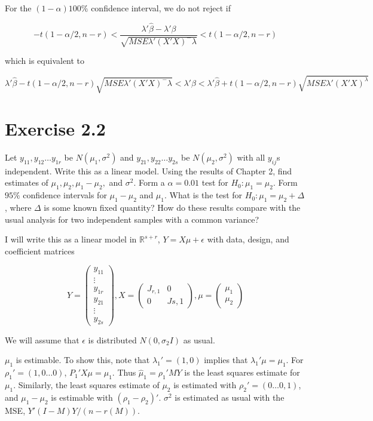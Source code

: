 \documentclass{article}
\newcommand{\R}{\mathbb{R}}
\begin{document}
For the $(1-\alpha)100\%$ confidence interval, we do not reject if

\[
-t(1-\alpha/2, n-r) < \frac{\lambda'\hat{\beta} - \lambda'\beta}{
\sqrt{MSE\lambda'(X'X)^-\lambda}
} < t(1-\alpha/2, n-r)
\]

which is equivalent to

\[
\lambda'\hat{\beta} - t(1-\alpha/2, n-r)\sqrt{MSE\lambda'(X'X)^-\lambda} < \lambda'\beta < \lambda'\hat{\beta} + t(1-\alpha/2, n-r)\sqrt{MSE\lambda'(X'X)^\lambda}
\]

\section*{Exercise 2.2}
Let $y_{11}, y_{12} \dots y_{1r}$ be $N(\mu_1, \sigma^2)$ and $y_{21}, y_{22} \dots y_{2s}$ be $N(\mu_2, \sigma^2)$ with all $y_{ij}$s independent. Write this as a linear model. Using the results of Chapter 2, find estimates of $\mu_1, \mu_2, \mu_1-\mu_2,$ and $\sigma^2$. Form a $\alpha = 0.01$ test for $H_0:\mu_1 = \mu_2$. Form $95\%$ confidence intervals for $\mu_1-\mu_2$ and $\mu_1$. What is the test for $H_0: \mu_1 = \mu_2 + \Delta$, where $\Delta$ is some known fixed quantity? How do these results compare with the usual analysis for two independent samples with a common variance?

I will write this as a linear model in $\R^{s+r}$, $Y=X\mu + \epsilon$ with data, design, and coefficient matrices

\[
Y = \begin{pmatrix}
y_{11} \\
\vdots \\
y_{1r} \\
y_{21} \\
\vdots \\
y_{2s}
\end{pmatrix},
X = \begin{pmatrix}
J_{r,1} & 0 \\
0 & J{s, 1}
\end{pmatrix},
\mu = \begin{pmatrix}
\mu_1 \\ \mu_2
\end{pmatrix}
\]

We will assume that $\epsilon$ is distributed $N(0, \sigma_2I)$ as usual.

$\mu_1$ is estimable. To show this, note that $\lambda_1' = (1, 0)$ implies that $\lambda_1' \mu = \mu_1$. For $\rho_1' = (1, 0 \dots 0)$, $P_1'X\mu = \mu_1$. Thus $\hat{\mu}_1 = \rho_1'MY$ is the least squares estimate for $\mu_1$. Similarly, the least squares estimate of $\mu_2$ is estimated with $\rho_2' = (0 \dots 0, 1)$, and $\mu_1 - \mu_2$ is estimable with $(\rho_1 - \rho_2)'$. $\sigma^2$ is estimated as usual with the MSE, $Y'(I-M)Y/(n-r(M))$.
\end{document}

